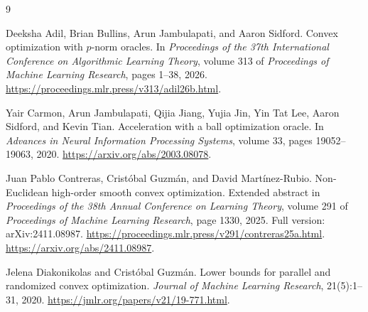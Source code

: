 \documentclass[11pt]{article}
\theoremstyle{definition}
\theoremstyle{remark}
\begin{document}
\begin{thebibliography}{9}

Deeksha Adil, Brian Bullins, Arun Jambulapati, and Aaron Sidford.
\newblock Convex optimization with $p$-norm oracles.
\newblock In \emph{Proceedings of the 37th International Conference on
Algorithmic Learning Theory}, volume 313 of \emph{Proceedings of Machine
Learning Research}, pages 1--38, 2026.
\newblock \url{https://proceedings.mlr.press/v313/adil26b.html}.

Yair Carmon, Arun Jambulapati, Qijia Jiang, Yujia Jin, Yin Tat Lee,
Aaron Sidford, and Kevin Tian.
\newblock Acceleration with a ball optimization oracle.
\newblock In \emph{Advances in Neural Information Processing Systems},
volume 33, pages 19052--19063, 2020.
\newblock \url{https://arxiv.org/abs/2003.08078}.

Juan Pablo Contreras, Crist\'obal Guzm\'an, and David Mart\'inez-Rubio.
\newblock Non-Euclidean high-order smooth convex optimization.
\newblock Extended abstract in \emph{Proceedings of the 38th Annual
Conference on Learning Theory}, volume 291 of \emph{Proceedings of
Machine Learning Research}, page 1330, 2025.
\newblock Full version: arXiv:2411.08987.
\newblock \url{https://proceedings.mlr.press/v291/contreras25a.html}.
\newblock \url{https://arxiv.org/abs/2411.08987}.

Jelena Diakonikolas and Crist\'obal Guzm\'an.
\newblock Lower bounds for parallel and randomized convex optimization.
\newblock \emph{Journal of Machine Learning Research}, 21(5):1--31, 2020.
\newblock \url{https://jmlr.org/papers/v21/19-771.html}.

\end{thebibliography}
\end{document}

